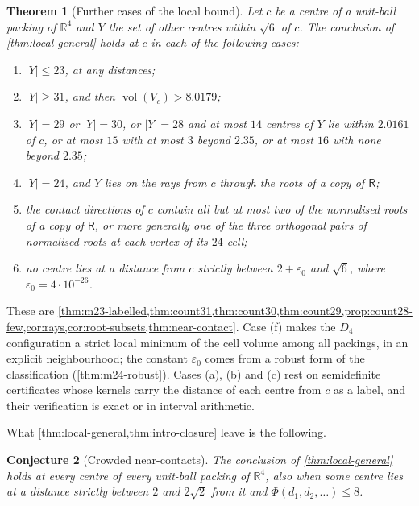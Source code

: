 \documentclass[11pt,reqno]{amsart}
\renewcommand{\_}{\origunderscore\allowbreak}
\numberwithin{equation}{section}
\theoremstyle{plain}
\newtheorem{thm}{Theorem}[section]
\newtheorem{conjecture}[thm]{Conjecture}
\theoremstyle{definition}
\theoremstyle{remark}
\newcommand{\Rt}{\mathsf{R}}                 %
\DeclareMathOperator{\vol}{vol}
\begin{document}
\begin{thm}[Further cases of the local bound]\label{thm:intro-closure}
Let $c$ be a centre of a unit-ball packing of $\mathbb{R}^4$ and $Y$ the
set of other centres within $\sqrt6$ of $c$. The conclusion of
\cref{thm:local-general} holds at $c$ in each of the following cases:
\begin{enumerate}[label=\textup{(\alph*)},leftmargin=2.2em]
\item $|Y|\le23$, at any distances;
\item $|Y|\ge31$, and then $\vol(V_c)>8.0179$;
\item $|Y|=29$ or $|Y|=30$, or $|Y|=28$ and at most $14$ centres of $Y$
lie within $2.0161$ of $c$, or at most $15$ with at most $3$ beyond $2.35$,
or at most $16$ with none beyond $2.35$;
\item $|Y|=24$, and $Y$ lies on the rays from $c$ through the roots of a
copy of $\Rt$;
\item the contact directions of $c$ contain all but at most two of the
normalised roots of a copy of $\Rt$, or more generally one of the three
orthogonal pairs of normalised roots at each vertex of its $24$-cell;
\item no centre lies at a distance from $c$ strictly between
$2+\varepsilon_0$ and $\sqrt6$, where $\varepsilon_0=4\cdot10^{-26}$.
\end{enumerate}
\end{thm}

These are \cref{thm:m23-labelled,thm:count31,thm:count30,thm:count29,prop:count28-few,cor:rays,cor:root-subsets,thm:near-contact}.
Case (f) makes the $D_4$ configuration a strict local minimum of the cell
volume among all packings, in an explicit neighbourhood; the constant
$\varepsilon_0$ comes from a robust form of the classification
(\cref{thm:m24-robust}). Cases (a), (b) and (c) rest on semidefinite
certificates whose kernels carry the distance of each centre from $c$ as a
label, and their verification is exact or in interval arithmetic.

What \cref{thm:local-general,thm:intro-closure} leave is the following.

\begin{conjecture}[Crowded near-contacts]\label{conj:shell}
The conclusion of \cref{thm:local-general} holds at every centre of every
unit-ball packing of $\mathbb{R}^4$, also when some centre lies at a
distance strictly between $2$ and $2\sqrt2$ from it and
$\Phi(d_1,d_2,\dots)\le8$.
\end{conjecture}
\end{document}
